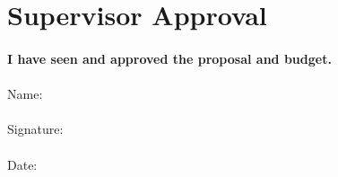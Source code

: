 \documentclass[11pt,a4paper,titlepage]{article}
\begin{document}
	
	\newpage
	
	\section{Supervisor Approval}
	
	\paragraph{}\textbf{I have seen and approved the proposal and budget.}

	\paragraph{}Name:
	
	\paragraph{}Signature:
	
	\paragraph{}Date:
	
\end{document}
